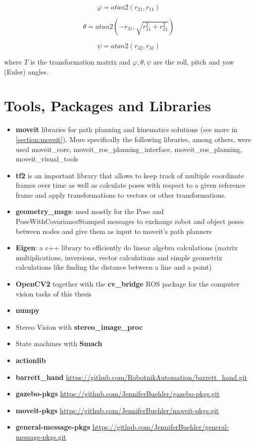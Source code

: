 \[
φ = atan2(r_{21}, r_{11})
\]

\[
θ = atan2(-r_{31}, \sqrt{r_{11}^2 + r_{21}^2})
\]

\[
ψ = atan2(r_{32}, r_{33})
\]

where $T$ is the transformation matrix and $φ, θ, ψ$ are the roll, pitch and yaw (Euler) angles.


\section{Tools, Packages and Libraries}

\begin{itemize}
	\item \textbf{moveit} libraries for path planning and kinematics solutions (see more in \ref{section:moveit}). More specifically the following libraries, among others, were used 
	moveit\_core, moveit\_ros\_planning\_interface, moveit\_ros\_planning, moveit\_visual\_tools
	\item \textbf{tf2} is an important library that allows to keep track of multiple coordinate frames over time as well as calculate poses with respect to a given reference frame and apply
	transformations to vectors or other transformations.
	\item \textbf{geometry\_msgs}: used mostly for the Pose and PoseWithCovarianceStamped messages to exchange robot and object poses between nodes and give them as input to moveit's path planners
	\item \textbf{Eigen}: a c++ library to efficiently do linear algebra calculations (matrix multiplications, inversions, vector calculations and simple geometrix calculations like finding the distance between a line and a 
	point)
	\item \textbf{OpenCV2} together with the \textbf{cv\_bridge} ROS package for the computer vision tasks of this thesis
	\item \textbf{numpy}
	\item Stereo Vision with \textbf{stereo\_image\_proc}
	\item State machines with \textbf{Smach}
	\item \textbf{actionlib}
	\item \textbf{barrett\_hand} \url{https://github.com/RobotnikAutomation/barrett\_hand.git}
	\item \textbf{gazebo-pkgs} \url{https://github.com/JenniferBuehler/gazebo-pkgs.git}
	\item \textbf{moveit-pkgs} \url{https://github.com/JenniferBuehler/moveit-pkgs.git}
	\item \textbf{general-message-pkgs} \url{https://github.com/JenniferBuehler/general-message-pkgs.git}
\end{itemize}
